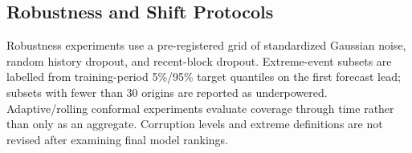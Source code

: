 \subsection{Robustness and Shift Protocols}
Robustness experiments use a pre-registered grid of standardized Gaussian noise, random history dropout, and recent-block dropout. Extreme-event subsets are labelled from training-period 5\%/95\% target quantiles on the first forecast lead; subsets with fewer than 30 origins are reported as underpowered. Adaptive/rolling conformal experiments evaluate coverage through time rather than only as an aggregate. Corruption levels and extreme definitions are not revised after examining final model rankings.

